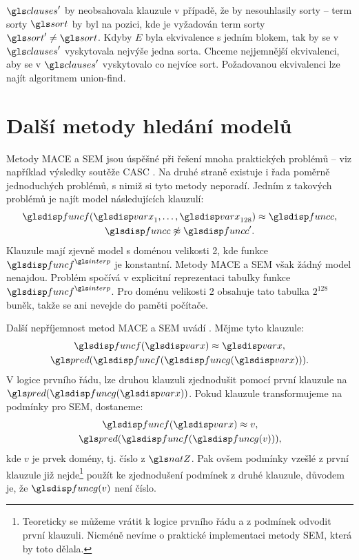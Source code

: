$\clauses'$ by neobsahovala klauzule v případě, že by nesouhlasily
sorty -- term sorty $\sort$ by byl na pozici,
kde je vyžadován term sorty $\sort' \neq \sort$. Kdyby $E$ byla ekvivalence
s jedním blokem, tak by se v $\clauses'$ vyskytovala nejvýše jedna sorta.
Chceme nejjemnější ekvivalenci, aby se v $\clauses'$ vyskytovalo
co nejvíce sort. Požadovanou ekvivalenci lze najít algoritmem union-find.

\section{Další metody hledání modelů}

Metody MACE a SEM jsou úspěšné při řešení mnoha praktických problémů
-- viz například výsledky soutěže CASC \cite{sutcliffe2006casc}.
Na druhé straně existuje i řada poměrně jednoduchých problémů,
s nimiž si tyto metody neporadí. Jedním z takových problémů
je najít model následujících klauzulí:
\begin{gather*}
  \func(\var_1 \comdots \var_{128}) \approx \funcC, \\
  \funcC \not\approx \funcC'.
\end{gather*}
Klauzule mají zjevně model s doménou velikosti 2, kde funkce $\func^\interp$
je konstantní. Metody MACE a SEM však žádný model nenajdou.
Problém spočívá v explicitní reprezentaci tabulky funkce $\func^\interp$.
Pro doménu velikosti 2 obsahuje tato tabulka $2^{128}$ buněk,
takže se ani nevejde do paměti počítače.

Další nepříjemnost metod MACE a SEM uvádí \cite{hillenbrand2013superposition}.
Mějme tyto klauzule:
\begin{gather*}
\func(\var) \approx \var, \\
\pred(\func(\funcG(\var))).
\end{gather*}
V logice prvního řádu, lze
druhou klauzuli zjednodušit pomocí první klauzule na $\pred(\funcG(\var))$.
Pokud klauzule transformujeme na podmínky pro SEM, dostaneme:
\begin{gather*}
\func(\var) \approx v, \\
\pred(\func(\funcG(v))),
\end{gather*}
kde $v$ je prvek domény, tj. číslo z $\natZ$.
Pak ovšem podmínky vzešlé z první klauzule již nejde\footnote{Teoreticky
se  můžeme vrátit k logice prvního řádu a z podmínek
odvodit první klauzuli. Nicméně nevíme o praktické implementaci
metody SEM, která by toto dělala.} použít
ke zjednodušení podmínek z druhé klauzule, důvodem je, že
$\funcG(v)$ není číslo.

